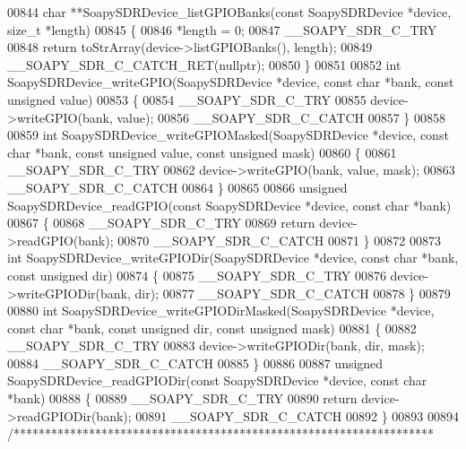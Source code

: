 \begin{DoxyCode}
00844 \textcolor{keywordtype}{char} **SoapySDRDevice_listGPIOBanks(\textcolor{keyword}{const} SoapySDRDevice *device, \textcolor{keywordtype}{size\_t} *length)
00845 \{
00846     *length = 0;
00847     __SOAPY_SDR_C_TRY
00848     \textcolor{keywordflow}{return} toStrArray(device->listGPIOBanks(), length);
00849     __SOAPY_SDR_C_CATCH_RET(\textcolor{keyword}{nullptr});
00850 \}
00851 
00852 \textcolor{keywordtype}{int} SoapySDRDevice_writeGPIO(SoapySDRDevice *device, \textcolor{keyword}{const} \textcolor{keywordtype}{char} *bank, \textcolor{keyword}{const} \textcolor{keywordtype}{unsigned} value)
00853 \{
00854     __SOAPY_SDR_C_TRY
00855     device->writeGPIO(bank, value);
00856     __SOAPY_SDR_C_CATCH
00857 \}
00858 
00859 \textcolor{keywordtype}{int} SoapySDRDevice_writeGPIOMasked(SoapySDRDevice *device, \textcolor{keyword}{const} \textcolor{keywordtype}{char} *bank, \textcolor{keyword}{const} \textcolor{keywordtype}{unsigned} value, \textcolor{keyword}{const} \textcolor{keywordtype}{
      unsigned} mask)
00860 \{
00861     __SOAPY_SDR_C_TRY
00862     device->writeGPIO(bank, value, mask);
00863     __SOAPY_SDR_C_CATCH
00864 \}
00865 
00866 \textcolor{keywordtype}{unsigned} SoapySDRDevice_readGPIO(\textcolor{keyword}{const} SoapySDRDevice *device, \textcolor{keyword}{const} \textcolor{keywordtype}{char} *bank)
00867 \{
00868     __SOAPY_SDR_C_TRY
00869     \textcolor{keywordflow}{return} device->readGPIO(bank);
00870     __SOAPY_SDR_C_CATCH
00871 \}
00872 
00873 \textcolor{keywordtype}{int} SoapySDRDevice_writeGPIODir(SoapySDRDevice *device, \textcolor{keyword}{const} \textcolor{keywordtype}{char} *bank, \textcolor{keyword}{const} \textcolor{keywordtype}{unsigned} dir)
00874 \{
00875     __SOAPY_SDR_C_TRY
00876     device->writeGPIODir(bank, dir);
00877     __SOAPY_SDR_C_CATCH
00878 \}
00879 
00880 \textcolor{keywordtype}{int} SoapySDRDevice_writeGPIODirMasked(SoapySDRDevice *device, \textcolor{keyword}{const} \textcolor{keywordtype}{char} *bank, \textcolor{keyword}{const} \textcolor{keywordtype}{unsigned} dir, \textcolor{keyword}{const} \textcolor{keywordtype}{
      unsigned} mask)
00881 \{
00882     __SOAPY_SDR_C_TRY
00883     device->writeGPIODir(bank, dir, mask);
00884     __SOAPY_SDR_C_CATCH
00885 \}
00886 
00887 \textcolor{keywordtype}{unsigned} SoapySDRDevice_readGPIODir(\textcolor{keyword}{const} SoapySDRDevice *device, \textcolor{keyword}{const} \textcolor{keywordtype}{char} *bank)
00888 \{
00889     __SOAPY_SDR_C_TRY
00890     \textcolor{keywordflow}{return} device->readGPIODir(bank);
00891     __SOAPY_SDR_C_CATCH
00892 \}
00893 
00894 \textcolor{comment}{/*******************************************************************}

\end{DoxyCode}

